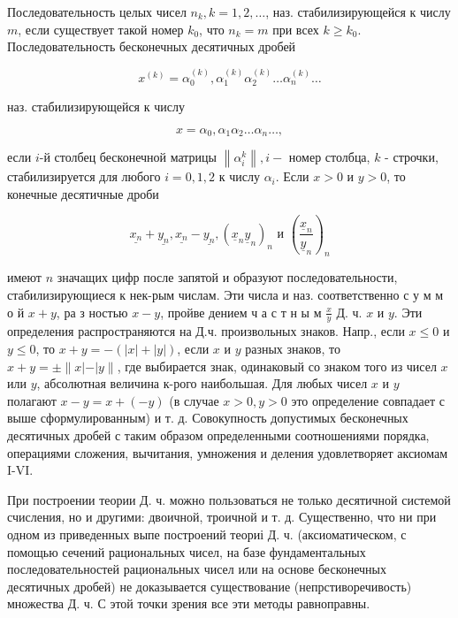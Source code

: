 \documentclass[10pt]{article}
\begin{document}
Последовательность целых чисел $n_{k}, k=1,2, \ldots$, наз. стабилизирующейся к числу $m$, если существует такой номер $k_{0}$, что $n_{k}=m$ при всех $k \geqslant k_{0}$. Последовательность бесконечных десятичных дробей



\[

x^{(k)}=\alpha_{0}^{(k)}, \alpha_{1}^{(k)} \alpha_{2}^{(k)} \ldots \alpha_{n}^{(k)} \ldots

\]



наз. стабилизирующейся к числу



\[

x=\alpha_{0}, \alpha_{1} \alpha_{2} \ldots \alpha_{n} \ldots,

\]



если $i$-й столбец бесконечной матрицы $\left\|\alpha_{i}^{k}\right\|, i-$ номер столбца, $k$ - строчки, стабилизируется для любого $i=0,1,2$ к числу $\alpha_{i}$. Если $x>0$ и $y>0$, то конечные десятичные дроби



\[

\underline{x_{n}}+\underline{y_{n}}, \underline{x_{n}}-\underline{y_{n}},\left(\underline{x}_{n} \underline{y}_{n}\right)_{n} \text { и }\left(\frac{\underline{x}_{n}}{\underline{y}_{n}}\right)_{n}

\]



имеют $n$ значащих цифр после запятой и образуют последовательности, стабилизирующиеся к нек-рым числам. Эти числа и наз. соответственно с у м м о й $x+y$, ра з ностью $x-y$, пройве дением ч а с т н ы м $\frac{x}{y}$ Д. ч. $x$ и $y$. Эти определения распространяются на Д.ч. произвольных знаков. Напр., если $x \leqslant 0$ и $y \leqslant 0$, то $x+y=-(|x|+|y|)$, если $x$ и $y$ разных знаков, то $x+y= \pm\|x|-| y\|$, где выбирается знак, одинаковый со знаком того из чисел $x$ или $y$, абсолютная величина к-рого наибольшая. Для любых чисел $x$ и $y$ полагают $x-y=x+(-y)$ (в случае $x>0, y>0$ это определение совпадает с выше сформулированным) и т. д. Совокупность допустимых бесконечных десятичных дробей с таким образом определенными соотношениями порядка, операциями сложения, вычитания, умножения и деления удовлетворяет аксиомам I-VI.



При построении теории Д. ч. можно пользоваться не только десятичной системой счисления, но и другими: двоичной, троичной и т. д. Существенно, что ни при одном из приведенных выпе построений теориі Д. ч. (аксиоматическом, с помощью сечений рациональных чисел, на базе фундаментальных последовательностей рациональных чисел или на основе бесконечных десятичных дробей) не доказывается существование (непрстиворечивость) множества Д. ч. С этой точки зрения все эти методы равноправны.
\end{document}
